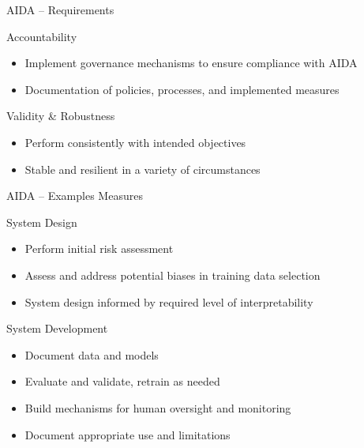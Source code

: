 \documentclass[ignorenonframetext,xcolor=x11names]{beamer}
\begin{document}
\begin{frame}[label=advanced]{AIDA -- Requirements}
\begin{block}{Accountability}
\begin{itemize}
  \item Implement governance mechanisms to ensure compliance with AIDA
  \item Documentation of policies, processes, and implemented measures
\end{itemize}
\end{block}

\begin{block}{Validity \& Robustness}
\begin{itemize}
  \item Perform consistently with intended objectives
  \item Stable and resilient in a variety of circumstances
\end{itemize}
\end{block}
\end{frame}

\begin{frame}[label=advanced]{AIDA -- Examples Measures}
\begin{block}{System Design}
\begin{itemize}
   \item Perform initial risk assessment
   \item Assess and address potential biases in training data selection
   \item System design informed by required level of interpretability
\end{itemize}
\end{block}

\begin{block}{System Development}
\begin{itemize}
   \item Document data and models
   \item Evaluate and validate, retrain as needed
   \item Build mechanisms for human oversight and monitoring
   \item Document appropriate use and limitations
\end{itemize}
\end{block}
\end{frame}
\end{document}
